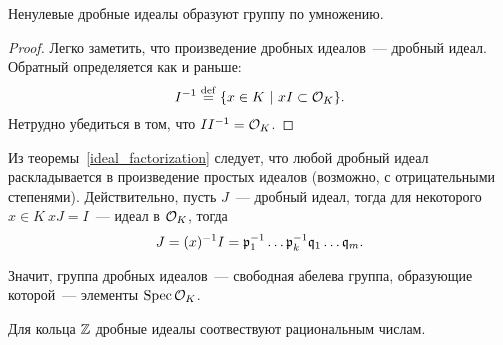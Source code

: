 	\begin{statement} 
		Ненулевые дробные идеалы образуют группу по умножению. 
	\end{statement}

	\begin{proof}
		Легко заметить, что произведение дробных идеалов~--- дробный идеал. Обратный определяется как и раньше:
		\[
			I^{-1} \stackrel{\mathrm{def}}{=} \{ x \in K \ \vert \ xI \subset \mathcal{O}_{K} \}.
		\]
		Нетрудно убедиться в том, что $I I^{-1} = \mathcal{O}_{K}$. 
	\end{proof}

	Из теоремы~\ref{ideal_factorization} следует, что любой дробный идеал раскладывается в произведение простых идеалов (возможно, с отрицательными степенями). Действительно, пусть $J$~--- дробный идеал, тогда для некоторого $x \in K \ xJ = I$~--- идеал в $\mathcal{O}_{K}$, тогда 
	\[
		J = (x)^{-1}I = \mathfrak{p}_{1}^{-1} \ldots \mathfrak{p}_{k}^{-1} \mathfrak{q}_{1}\ldots \mathfrak{q}_{m}.
	\]

	Значит, группа дробных идеалов~--- свободная абелева группа, образующие которой~--- элементы $\operatorname{Spec}{\mathcal{O}_{K}}$.

	\begin{example}
		Для кольца $\mathbb{Z}$ дробные идеалы соотвествуют рациональным числам. 
	\end{example}


	



	